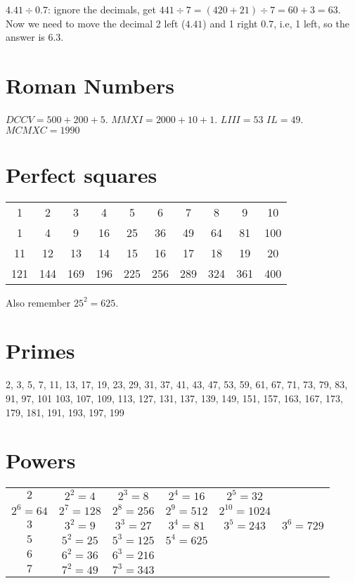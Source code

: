 \documentclass[fullpage,twocolumn]{article}
\begin{document}
$4.41 \div 0.7$: ignore the decimals, get $441\div 7 = (420 + 21) \div 7 = 60 + 3 = 63$.
Now we need to move the decimal 2 left ($4.41$) and 1 right $0.7$, i.e, 1 left,
so the answer is $6.3$.

\section{Roman Numbers}

$DCCV = 500 + 200 + 5$. $MMXI = 2000 + 10  + 1$. $LIII = 53$ $IL = 49$. $MCMXC = 1990$



\section{Perfect squares}
{\tiny
\begin{tabular}{|c|c|c|c|c|c|c|c|c|c|} \hline
1 & 2 & 3 & 4 & 5 & 6 & 7 & 8 & 9 & 10 \\ 
1 & 4 & 9 & 16 & 25 & 36 & 49 & 64 & 81 & 100 \\ \hline
11 & 12 & 13 & 14 & 15 & 16 & 17 & 18 & 19 & 20 \\ 
121 & 144 & 169 & 196 & 225 & 256 & 289 & 324 & 361 & 400 \\ \hline
\end{tabular}
}

Also remember $25^2 = 625$.

\section{Primes}
2, 3, 5, 7, 11, 13, 17, 19, 23, 29, 31, 37, 41, 43, 47, 53, 59, 61, 67, 71, 73, 79, 83, 91, 97, 101    103, 107, 109, 113, 127, 131, 137, 139, 149, 151, 157, 163, 167, 173, 179, 181, 191, 193, 197, 199

\section{Powers}
{\tiny
\begin{tabular}{|c|c|c|c|c|c|} \hline
$2$ & $2^2 = 4$ & $2^3 = 8$ & $2^4 = 16$ & $2^5 = 32$  & \\
$2^6 = 64$ & $2^7 = 128$ & $2^8 = 256$ & $2^9 = 512$ & $2^{10} = 1024$  & \\
$3$ & $3^2 = 9$ & $3^3 = 27$ & $3^4 = 81$ & $3^5  = 243$ & $3^6 = 729$  \\
$5$ & $5^2 = 25$ & $5^3 = 125$ & $5^4 = 625$  & & \\
$6$ & $6^2 = 36$ & $6^3 = 216$ &     &         &  \\
$7$ & $7^2 = 49$ & $7^3 = 343$ &     &         & \\ \hline
\end{tabular}
}
\end{document}
